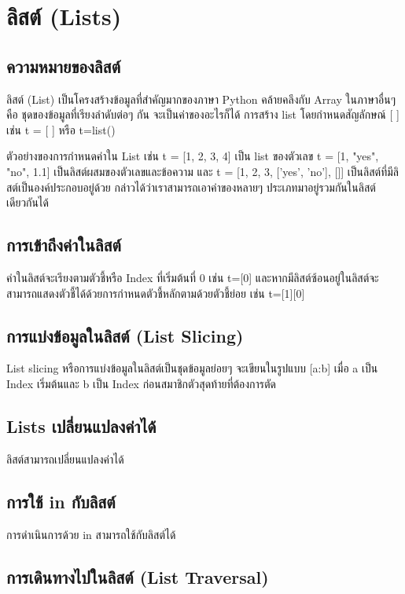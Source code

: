 \chapter{ลิสต์ (Lists)}
\section{ความหมายของลิสต์}

ลิสต์ (List) เป็นโครงสร้างข้อมูลที่สำคัญมากของภาษา Python คล้ายคลึงกับ Array ในภาษาอื่นๆ คือ ชุดของข้อมูลที่เรียงลำดับต่อๆ กัน จะเป็นค่าของอะไรก็ได้ การสร้าง list โดยกำหนดสัญลักษณ์ [ ] เช่น t = [ ] หรือ t=list() 

ตัวอย่างของการกำหนดค่าใน List เช่น t = [1, 2, 3, 4] เป็น list ของตัวเลข t = [1, "yes", "no", 1.1] เป็นลิสต์ผสมของตัวเลขและข้อความ และ t = [1, 2, 3, ['yes', 'no'], []] เป็นลิสต์ที่มีลิสต์เป็นองค์ประกอบอยู่ด้วย กล่าวได้ว่าเราสามารถเอาค่าของหลายๆ ประเภทมาอยู่รวมกันในลิสต์เดียวกันได้ 

\section{การเข้าถึงค่าในลิสต์}

ค่าในลิสต์จะเรียงตามตัวชี้หรือ Index ที่เริ่มต้นที่ 0 เช่น t=[0] และหากมีลิสต์ซ้อนอยู่ในลิสต์จะสามารถแสดงตัวชี้ได้ด้วยการกำหนดตัวชี้หลักตามด้วยตัวชี้ย่อย เช่น t=[1][0]

\section{การแบ่งข้อมูลในลิสต์ (List Slicing)}

List slicing หรือการแบ่งข้อมูลในลิสต์เป็นชุดข้อมูลย่อยๆ จะเขียนในรูปแบบ [a:b] เมื่อ a เป็น Index เริ่มต้นและ b เป็น Index ก่อนสมาชิกตัวสุดท้ายที่ต้องการตัด

\section{Lists เปลี่ยนแปลงค่าได้}
ลิสต์สามารถเปลี่ยนแปลงค่าได้ 

\section{การใช้ in กับลิสต์}

การดำเนินการด้วย in สามารถใช้กับลิสต์ได้ 

\section{การเดินทางไปในลิสต์ (List Traversal)}
